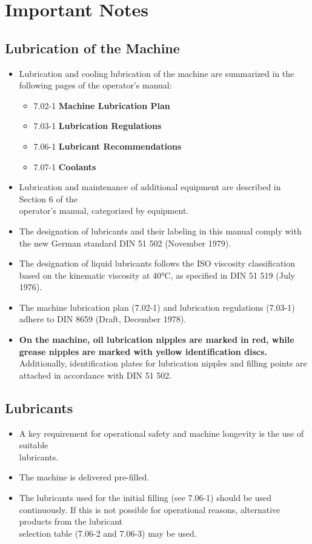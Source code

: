 
\section{Important Notes}

\subsection*{Lubrication of the Machine}
\begin{itemize}
    \item Lubrication and cooling lubrication of the machine are summarized in the following pages of the operator's manual:
    \begin{itemize}
        \item 7.02-1 \textbf{Machine Lubrication Plan}
        \item 7.03-1 \textbf{Lubrication Regulations}
        \item 7.06-1 \textbf{Lubricant Recommendations}
        \item 7.07-1 \textbf{Coolants}
    \end{itemize}
    \item Lubrication and maintenance of additional equipment are described in Section 6 of the \\operator's manual, categorized by equipment.
    \item The designation of lubricants and their labeling in this manual comply with the new German standard DIN 51 502 (November 1979).
    \item The designation of liquid lubricants follows the ISO viscosity classification based on the kinematic viscosity at 40°C, as specified in DIN 51 519 (July 1976).
    \item The machine lubrication plan (7.02-1) and lubrication regulations (7.03-1) adhere to DIN 8659 (Draft, December 1978).
    \item \textbf{On the machine, oil lubrication nipples are marked in red, while grease nipples are marked with yellow identification discs.} Additionally, identification plates for lubrication nipples and filling points are attached in accordance with DIN 51 502.
\end{itemize}

\subsection*{Lubricants}
\begin{itemize}
    \item A key requirement for operational safety and machine longevity is the use of suitable \\lubricants.
    \item The machine is delivered pre-filled\footnotemark.
    \item The lubricants used for the initial filling (see 7.06-1) should be used continuously. If this is not possible for operational reasons, alternative products from the lubricant \\selection table (7.06-2 and 7.06-3) may be used.
\end{itemize}

